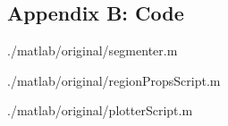 \documentclass[ twocolumn,notitlepage]{ revtex4-1}
\begin{document}
\newpage
\begin{widetext}
\subsection*{Appendix B: Code}

                {./matlab/original/segmenter.m}

\newpage

            {./matlab/original/regionPropsScript.m}

\newpage          

                {./matlab/original/plotterScript.m}
\end{widetext}
\end{document}
